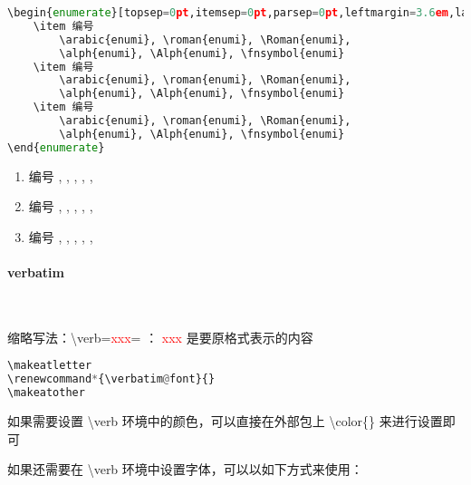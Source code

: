 \begin{lstlisting}[language={python}]
\begin{enumerate}[topsep=0pt,itemsep=0pt,parsep=0pt,leftmargin=3.6em,label=\arabic*>]
    \item 编号
        \arabic{enumi}, \roman{enumi}, \Roman{enumi}, 
        \alph{enumi}, \Alph{enumi}, \fnsymbol{enumi}
    \item 编号
        \arabic{enumi}, \roman{enumi}, \Roman{enumi}, 
        \alph{enumi}, \Alph{enumi}, \fnsymbol{enumi}
    \item 编号
        \arabic{enumi}, \roman{enumi}, \Roman{enumi}, 
        \alph{enumi}, \Alph{enumi}, \fnsymbol{enumi}
\end{enumerate}
\end{lstlisting}

\begin{enumerate}[topsep=0pt,itemsep=0pt,parsep=0pt,leftmargin=3.6em,label=\arabic*>]
    \item 编号
        , , , , , 
    \item 编号
        , , , , , 
    \item 编号
        , , , , , 
\end{enumerate}



\paragraph{verbatim}~{}

缩略写法：\textbackslash verb=\textcolor{red}{xxx}= ： \textcolor{red}{xxx} 是要原格式表示的内容


\begin{lstlisting}[language={python}]
\makeatletter
\renewcommand*{\verbatim@font}{}
\makeatother
\end{lstlisting}

如果需要设置 \textbackslash verb 环境中的颜色，可以直接在外部包上 \textbackslash color\{\} 来进行设置即可

如果还需要在  \textbackslash verb 环境中设置字体，可以以如下方式来使用：

